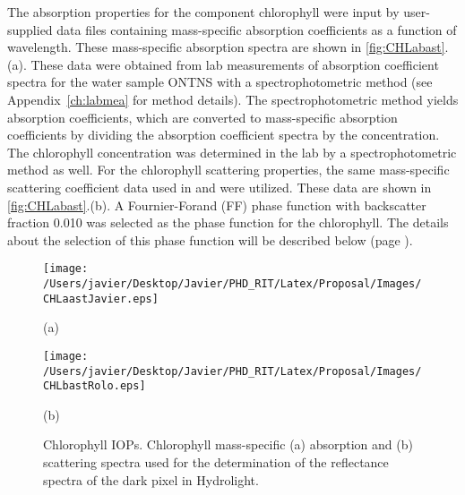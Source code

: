 The absorption properties for the component chlorophyll were input by user-supplied data files containing mass-specific absorption coefficients as a function of wavelength. These mass-specific absorption spectra are shown in \autoref{fig:CHLabast}.(a). These data were obtained from lab measurements of absorption coefficient spectra for the water sample ONTNS with a spectrophotometric method (see Appendix~\ref{ch:labmea} for method details). The spectrophotometric method yields absorption coefficients, which are converted to mass-specific absorption coefficients by dividing the absorption coefficient spectra by the concentration. The chlorophyll concentration was determined in the lab by a spectrophotometric method as well. For the chlorophyll scattering properties, the same mass-specific scattering coefficient data used in \citet{Raqueno:2000} and \citet{Raqueno:2003} were utilized. These data are shown in \autoref{fig:CHLabast}.(b). A Fournier-Forand (FF) phase function with backscatter fraction 0.010 was selected as the phase function for the chlorophyll. The details about the selection of this phase function will be described below (page \pageref{pag:phasefn}).
\begin{figure}[htb]
  \begin{minipage}[c]{0.48\linewidth}
    \centering
  	\texttt{[image: /Users/javier/Desktop/Javier/PHD\_RIT/Latex/Proposal/Images/CHLaastJavier.eps]}
    \centerline{(a)}\medskip
  \end{minipage}
  \hfill
  \begin{minipage}[c]{0.48\linewidth}
    \centering
  	\texttt{[image: /Users/javier/Desktop/Javier/PHD\_RIT/Latex/Proposal/Images/CHLbastRolo.eps]}
    \centerline{(b)}\medskip
  \end{minipage}
  \caption{Chlorophyll IOPs. Chlorophyll mass-specific (a) absorption and (b) scattering spectra used for the determination of the reflectance spectra of the dark pixel in Hydrolight. \label{fig:CHLabast} }   
\end{figure}

